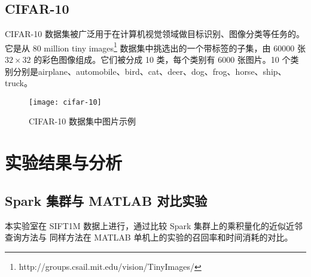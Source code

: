 \subsection{CIFAR-10}
CIFAR-10 数据集被广泛用于在计算机视觉领域做目标识别、图像分类等任务的。它是从 80 million tiny images\footnote{http://groups.csail.mit.edu/vision/TinyImages/} 数据集中挑选出的一个带标签的子集，由 60000 张 $32\times 32$ 的彩色图像组成。它们被分成 10 类，每个类别有 6000 张图片。10 个类别分别是airplane、automobile、bird、cat、deer、dog、frog、horse、ship、truck。

\begin{figure}[H]
  \centering
  \texttt{[image: cifar-10]}
  \caption{CIFAR-10 数据集中图片示例}
  \label{fig:cifar-10}
\end{figure}
\section{实验结果与分析}
\subsection{Spark 集群与 MATLAB 对比实验}
本实验室在 SIFT1M 数据上进行，通过比较 Spark 集群上的乘积量化的近似近邻查询方法与 同样方法在 MATLAB 单机上的实验的召回率和时间消耗的对比。

